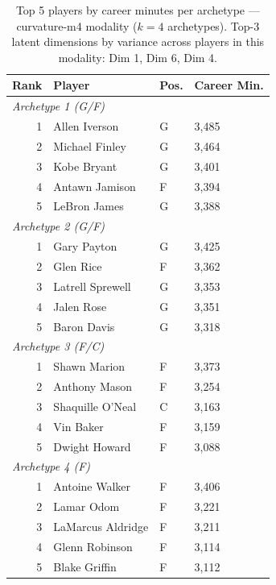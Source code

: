 \begin{table}[htbp]
  \centering\small
  \begin{tabular}{rlll}
    \toprule
    Rank & Player & Pos. & Career Min. \\
    \midrule
    \multicolumn{4}{l}{\textit{Archetype 1 (G/F)}} \\
    \midrule
    1 & Allen Iverson & G & 3,485 \\
    2 & Michael Finley & G & 3,464 \\
    3 & Kobe Bryant & G & 3,401 \\
    4 & Antawn Jamison & F & 3,394 \\
    5 & LeBron James & G & 3,388 \\
    \midrule[0.4pt]
    \multicolumn{4}{l}{\textit{Archetype 2 (G/F)}} \\
    \midrule
    1 & Gary Payton & G & 3,425 \\
    2 & Glen Rice & F & 3,362 \\
    3 & Latrell Sprewell & G & 3,353 \\
    4 & Jalen Rose & G & 3,351 \\
    5 & Baron Davis & G & 3,318 \\
    \midrule[0.4pt]
    \multicolumn{4}{l}{\textit{Archetype 3 (F/C)}} \\
    \midrule
    1 & Shawn Marion & F & 3,373 \\
    2 & Anthony Mason & F & 3,254 \\
    3 & Shaquille O'Neal & C & 3,163 \\
    4 & Vin Baker & F & 3,159 \\
    5 & Dwight Howard & F & 3,088 \\
    \midrule[0.4pt]
    \multicolumn{4}{l}{\textit{Archetype 4 (F)}} \\
    \midrule
    1 & Antoine Walker & F & 3,406 \\
    2 & Lamar Odom & F & 3,221 \\
    3 & LaMarcus Aldridge & F & 3,211 \\
    4 & Glenn Robinson & F & 3,114 \\
    5 & Blake Griffin & F & 3,112 \\
    \bottomrule
  \end{tabular}
  \caption{Top 5 players by career minutes per archetype --- curvature-m4 modality ($k=4$ archetypes). Top-3 latent dimensions by variance across players in this modality: Dim 1, Dim 6, Dim 4.}
  \label{tab:arch_reps_curvature_m4}
\end{table}


